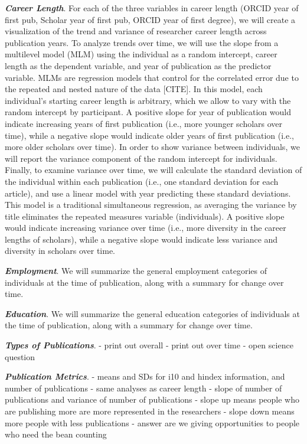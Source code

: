 \documentclass[
  english,
  man]{apa6}
\begin{document}
\textbf{\emph{Career Length}}. For each of the three variables in career length (ORCID year of first pub, Scholar year of first pub, ORCID year of first degree), we will create a visualization of the trend and variance of researcher career length across publication years. To analyze trends over time, we will use the slope from a multilevel model (MLM) using the individual as a random intercept, career length as the dependent variable, and year of publication as the predictor variable. MLMs are regression models that control for the correlated error due to the repeated and nested nature of the data {[}CITE{]}. In this model, each individual's starting career length is arbitrary, which we allow to vary with the random intercept by participant. A positive slope for year of publication would indicate increasing years of first publication (i.e., more younger scholars over time), while a negative slope would indicate older years of first publication (i.e., more older scholars over time). In order to show variance between individuals, we will report the variance component of the random intercept for individuals. Finally, to examine variance over time, we will calculate the standard deviation of the individual within each publication (i.e., one standard deviation for each article), and use a linear model with year predicting these standard deviations. This model is a traditional simultaneous regression, as averaging the variance by title eliminates the repeated measures variable (individuals). A positive slope would indicate increasing variance over time (i.e., more diversity in the career lengths of scholars), while a negative slope would indicate less variance and diversity in scholars over time.

\textbf{\emph{Employment}}. We will summarize the general employment categories of individuals at the time of publication, along with a summary for change over time.

\textbf{\emph{Education}}. We will summarize the general education categories of individuals at the time of publication, along with a summary for change over time.

\textbf{\emph{Types of Publications}}.
- print out overall
- print out over time
- open science question

\textbf{\emph{Publication Metrics}}.
- means and SDs for i10 and hindex information, and number of publications
- same analyses as career length - slope of number of publications and variance of number of publications
- slope up means people who are publishing more are more represented in the researchers
- slope down means more people with less publications
- answer are we giving opportunities to people who need the bean counting
\end{document}
